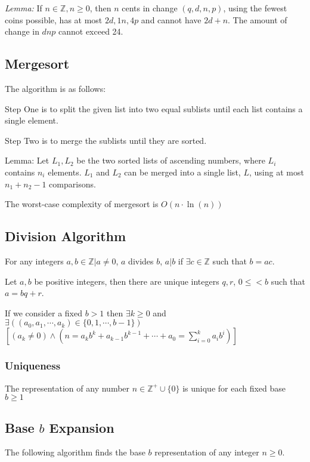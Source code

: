         \textit{Lemma:} If $n \in \mathbb{Z}, n \ge 0$, then $n$ cents in change $(q, d, n, p)$, using the fewest coins possible, has at most $2d, 1n, 4p$ and cannot have $2d + n$. The amount of change in $dnp$ cannot exceed 24.


    \subsection{Mergesort}
    The algorithm is as follows:

    Step One is to split the given list into two equal sublists until each list contains a single element.

    Step Two is to merge the sublists until they are sorted.

    Lemma: Let $L_1, L_2$ be the two sorted lists of ascending numbers, where $L_i$ contains $n_i$ elements. $L_1$ and $L_2$ can be merged into a single list, $L$, using at most $n_1 + n_2 - 1$ comparisons.

    The worst-case complexity of mergesort is $O(n \cdot \ln(n))$


    \subsection{Division Algorithm}
    For any integers $a, b \in \mathbb{Z} | a \neq 0$, $a$ divides $b$, $a | b$ if $\exists c \in \mathbb{Z}$ such that $b = ac$.

    Let $a,b$ be positive integers, then there are unique integers $q,r$, $0 \le < b$ such that $a = bq + r$.

    If we consider a fixed $b > 1$ then $\exists k \ge 0$ and $\exists \left((a_0, a_1, \cdots, a_k) \in \{ 0, 1, \cdots, b-1 \}\right)$
        $\left[ \left(a_k \neq 0\right) \wedge \left( n=a_kb^k + a_{k-1}b^{k-1} + \cdots + a_0 = \sum^k_{i=0} a_ib^i \right) \right]$

        \subsubsection{Uniqueness}
        The representation of any number $n \in \mathbb{Z}^+ \cup \{ 0 \}$ is unique for each fixed base $b \ge 1$

    \subsection{Base $b$ Expansion}
    The following algorithm finds the base $b$ representation of any integer $n \ge 0$.


